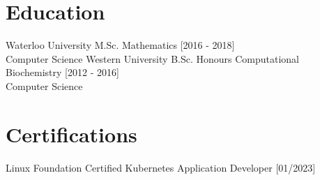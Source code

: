\documentclass[]{twentysecondcv}
\begin{document}
\section{Education}
\vspace{-10px}
\begin{twenty}
  \twentyitem
    {Waterloo University}
    {M.Sc. Mathematics}
    {[2016 - 2018]}
    {\\Computer Science}
  \twentyitem
    {Western University}
    {B.Sc. Honours Computational Biochemistry}
    {[2012 - 2016]}
    {\\Computer Science}
\end{twenty}


\section{Certifications}
\vspace{-12px}

\begin{twenty}
    \twentyitem
    {Linux Foundation}
    {Certified Kubernetes Application Developer}
    {[01/2023]}
    {}
\end{twenty}



\end{document}
